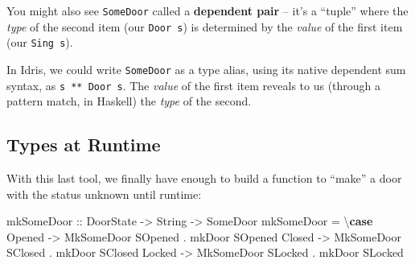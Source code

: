 \documentclass[]{article}
\newenvironment{Shaded}{}{}
\newcommand{\KeywordTok}[1]{\textcolor[rgb]{0.00,0.44,0.13}{\textbf{#1}}}
\newcommand{\DataTypeTok}[1]{\textcolor[rgb]{0.56,0.13,0.00}{#1}}
\newcommand{\StringTok}[1]{\textcolor[rgb]{0.25,0.44,0.63}{#1}}
\newcommand{\OtherTok}[1]{\textcolor[rgb]{0.00,0.44,0.13}{#1}}
\newcommand{\FunctionTok}[1]{\textcolor[rgb]{0.02,0.16,0.49}{#1}}
\newcommand{\NormalTok}[1]{#1}
\begin{document}
You might also see \texttt{SomeDoor} called a \textbf{dependent pair} -- it's a
``tuple'' where the \emph{type} of the second item (our \texttt{Door\ s}) is
determined by the \emph{value} of the first item (our \texttt{Sing\ s}).

In Idris, we could write \texttt{SomeDoor} as a type alias, using its native
dependent sum syntax, as \texttt{s\ **\ Door\ s}. The \emph{value} of the first
item reveals to us (through a pattern match, in Haskell) the \emph{type} of the
second.

\subsection{Types at Runtime}\label{types-at-runtime}

With this last tool, we finally have enough to build a function to ``make'' a
door with the status unknown until runtime:

\begin{Shaded}
\begin{Highlighting}[]
\OtherTok{mkSomeDoor ::} \DataTypeTok{DoorState} \OtherTok{->} \DataTypeTok{String} \OtherTok{->} \DataTypeTok{SomeDoor}
\NormalTok{mkSomeDoor }\FunctionTok{=}\NormalTok{ \textbackslash{}}\KeywordTok{case}
    \DataTypeTok{Opened} \OtherTok{->} \DataTypeTok{MkSomeDoor} \DataTypeTok{SOpened} \FunctionTok{.}\NormalTok{ mkDoor }\DataTypeTok{SOpened}
    \DataTypeTok{Closed} \OtherTok{->} \DataTypeTok{MkSomeDoor} \DataTypeTok{SClosed} \FunctionTok{.}\NormalTok{ mkDoor }\DataTypeTok{SClosed}
    \DataTypeTok{Locked} \OtherTok{->} \DataTypeTok{MkSomeDoor} \DataTypeTok{SLocked} \FunctionTok{.}\NormalTok{ mkDoor }\DataTypeTok{SLocked}
\end{Highlighting}
\end{Shaded}

\begin{Shaded}
\end{Shaded}
\end{document}
